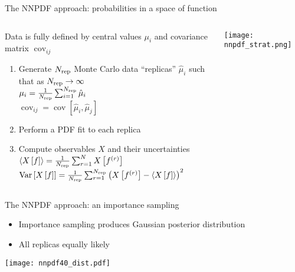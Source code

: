 \begin{frame}[t]{The NNPDF approach: probabilities in a space of function}
  \begin{columns}[T]
    \begin{column}[T]{0.49\textwidth}
      Data is fully defined by central values $\mu_i$ and covariance matrix $\operatorname{cov}_{ij}$
      \begin{enumerate}
        \item Generate $N_{\rm rep}$ {\color{datasamplegreen} Monte Carlo data} ``replicas'' $\hat{\mu}_i$ such that as $N_{\rm rep}\to \infty$ \\
        $\mu_i = \frac{1}{N_{\rm rep}}\sum_{i=1}^{N_{\rm rep}} \hat{\mu}_i$\\
        $\operatorname{cov}_{ij} = \operatorname{cov}[\hat{\mu}_i, \hat{\mu}_j]$
        \item Perform a {\color{red} PDF fit} to each replica
        \item Compute observables $X$ and their uncertainties\\
        $\left\langle X\left[f\right]\right\rangle=\frac{1}{N_{\rm rep}} \sum_{r=1}^N X\left[f^{(r)}\right]$\\
        $\operatorname{Var}\left[X\left[f\right]\right] = \frac{1}{N_{\rm rep}} \sum_{r=1}^{N_{\rm rep}}\left(X\left[f^{(r)}\right]-\left\langle X\left[f\right]\right\rangle\right)^2$
      \end{enumerate}
      \vspace*{0.3cm}
    \end{column}
    \begin{column}{0.49\textwidth}
      \texttt{[image: nnpdf\_strat.png]}
    \end{column}
  \end{columns}
\end{frame}


\begin{frame}[t]{The NNPDF approach: an importance sampling}
  \begin{itemize}
    \item Importance sampling produces Gaussian posterior distribution
    \item All replicas equally likely
  \end{itemize}
  \begin{center}
    \texttt{[image: nnpdf40\_dist.pdf]}
  \end{center}
\end{frame}



